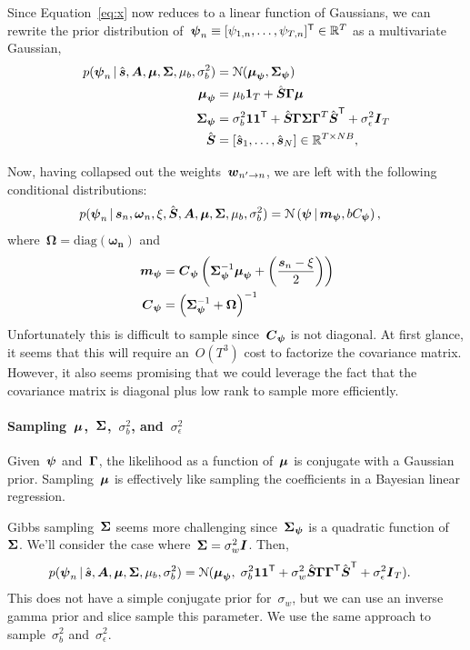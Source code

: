\documentclass[aos]{imsart} %
\begin{document}
Since Equation~\ref{eq:x} now reduces to a linear function of Gaussians, we can rewrite the prior distribution of~${\boldsymbol{\psi}_n\equiv [\psi_{1,n},\ldots,\psi_{T,n}]^{\mathsf{T}} \in \mathbb{R}^T}$ as a multivariate Gaussian,
\begin{align}
p(\bpsi_n \given \hat{\bs}, \bA, \bmu, \bSigma, \mu_b, \sigma_b^2) &= \distNormal(\bmu_{\bpsi}, \bSigma_{\bpsi}) \\
~
\bmu_{\bpsi} &= \mu_b \bone_T + \hat{\bS} \bGamma \bmu \\
~
\bSigma_{\bpsi} &= \sigma_b^2\bone\bone^\trans + \hat{\bS} \bGamma \bSigma \bGamma^T \hat{\bS}^\trans + \sigma_\epsilon^2 \bI_T  \\
~
\hat{\bS} &= \left[\hat{\bs}_1, \ldots, \hat{\bs}_N\right] \in \reals^{T\times NB}, 
\end{align}

Now, having collapsed out the weights~$\boldsymbol{w}_{n' \to n}$, we are left with the following conditional distributions:
\begin{align}
p(\bpsi_n \given \bs_n, \boldsymbol{\omega}_n, \xi, \hat{\bS}, \bA, \bmu, \bSigma, \mu_b, \sigma_b^2) &= \distNormal\left(\bpsi \given \bbm_{\bpsi}, bC_{\bpsi}\right),
\end{align}
where~${\boldsymbol{\Omega} = \text{diag}(\boldsymbol{\omega_n})}$ and
\begin{align}
\bbm_{\bpsi} &= \bC_{\bpsi}  \left( \bSigma_{\bpsi}^{-1} \bmu_{\bpsi} + \left( \frac{\bs_n - \xi}{2} \right) \right) \\
~
\bC_{\bpsi} &= \left(\bSigma_{\bpsi}^{-1} + \bOmega\right)^{-1}
\end{align}
Unfortunately this is difficult to sample since~$\boldsymbol{C}_{\boldsymbol{\psi}}$ is not diagonal. At first glance, it seems that this will require an~$O(T^3)$ cost to factorize the covariance matrix. However, it also seems promising that we could leverage the fact that the covariance matrix is diagonal plus low rank to sample more efficiently. 

\paragraph{Sampling~$\boldsymbol{\mu}$,~$\boldsymbol{\Sigma}$,~$\sigma_b^2$, and~$\sigma_\epsilon^2$ } Given~$\boldsymbol{\psi}$ and~$\boldsymbol{\Gamma}$, the likelihood as a function of~$\boldsymbol{\mu}$ is conjugate with a Gaussian prior. Sampling~$\boldsymbol{\mu}$ is effectively like sampling the coefficients in a Bayesian linear regression. 

Gibbs sampling~$\boldsymbol{\Sigma}$ seems more challenging since~$\boldsymbol{\Sigma}_{\boldsymbol{\psi}}$ is a quadratic function of~$\boldsymbol{\Sigma}$. We'll consider the case where~$\boldsymbol{\Sigma}=\sigma_w^2\boldsymbol{I}$. Then,
\begin{align}
p(\bpsi_n \given \hat{\bs}, \bA, \bmu, \bSigma, \mu_b, \sigma_b^2) &= \distNormal(\bmu_{\bpsi}, \; \sigma_b^2\bone\bone^\trans + \sigma_w^2 \hat{\bS} \bGamma \bGamma^\trans \hat{\bS}^\trans + \sigma_\epsilon^2 \bI_T).
\end{align}
This does not have a simple conjugate prior for~$\sigma_w$, but we can use an inverse gamma prior and slice sample this parameter. We use the same approach to sample~$\sigma_b^2$ and~$\sigma_\epsilon^2$.
\end{document}
